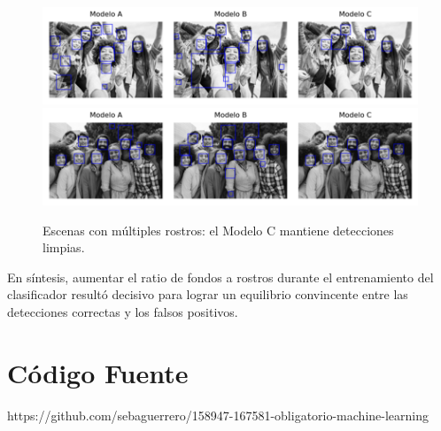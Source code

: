 \documentclass{article}
\begin{document}
\begin{figure}[H]
  \centering
  \includegraphics[width=\linewidth]{tarea_6/imagenes/6-faces.png}\\[4pt]
  \includegraphics[width=\linewidth]{tarea_6/imagenes/10-faces.png}
  \caption{Escenas con múltiples rostros: el Modelo C mantiene detecciones limpias.}
  \label{fig:modelos-10f}
\end{figure}

En síntesis, aumentar el ratio de fondos a rostros durante el entrenamiento del clasificador resultó decisivo para lograr un equilibrio convincente entre las detecciones correctas y los falsos positivos.


\pagebreak

\appendix

\section*{Código Fuente}

https://github.com/sebaguerrero/158947-167581-obligatorio-machine-learning
\end{document}
